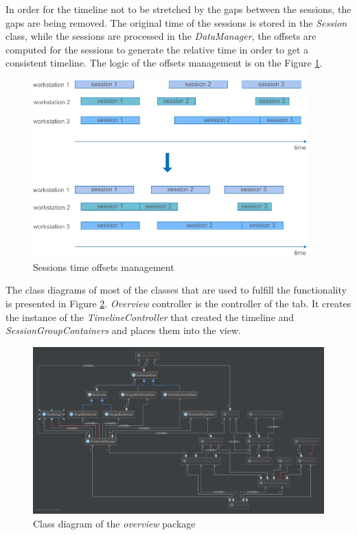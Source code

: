 In order for the timeline not to be stretched by the gaps between the sessions, the gaps are being removed. The original time of the sessions is stored in the \textit{Session} class, while the sessions are processed in the \textit{DataManager}, the offsets are computed for the sessions to generate the relative time in order to get a consistent timeline. The logic of the offsets management is on the Figure \ref{fig:offsets_management}.\\

\begin{figure}[htb]
 \centering
\includegraphics[width=300pt]{figures/offsets_management.jpg}
\caption{Sessions time offsets management}
\label{fig:offsets_management}
\end{figure}

The class diagrams of most of the classes that are used to fulfill the functionality is presented in Figure \ref{fig:d1}. \textit{Overview} controller is the controller of the tab. It creates the instance of the \textit{TimelineController} that created the timeline and   \textit{SessionGroupContainers} and places them into the view.\\

\begin{figure}[htb]
 \centering
\includegraphics[width=\textwidth]{figures/diagram1.jpg}
\caption{Class diagram of the \textit{overview} package}
\label{fig:d1}
\end{figure}

